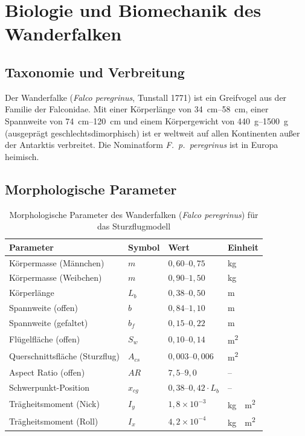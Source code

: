 ﻿\documentclass[12pt,a4paper]{article}
\theoremstyle{remark}
\begin{document}
	\section{Biologie und Biomechanik des Wanderfalken}
	\label{sec:biologie}
	
	\subsection{Taxonomie und Verbreitung}
	
	Der Wanderfalke (\textit{Falco peregrinus}, Tunstall 1771) ist ein Greifvogel aus der Familie der Falconidae. Mit einer Körperlänge von \SIrange{34}{58}{\cm}, einer Spannweite von \SIrange{74}{120}{\cm} und einem Körpergewicht von \SIrange{440}{1500}{\g} (ausgeprägt geschlechtsdimorphisch) ist er weltweit auf allen Kontinenten außer der Antarktis verbreitet. Die Nominatform \textit{F.~p.~peregrinus} ist in Europa heimisch.
	
	\subsection{Morphologische Parameter}
	
	\begin{table}[H]
		\centering
		\caption{Morphologische Parameter des Wanderfalken (\textit{Falco peregrinus}) für das Sturzflugmodell}
		\label{tab:morphologie}
		\begin{tabular}{llll}
			\toprule
			\textbf{Parameter} & \textbf{Symbol} & \textbf{Wert} & \textbf{Einheit} \\
			\midrule
			Körpermasse (Männchen) & $m$ & $0{,}60$--$0{,}75$ & \si{\kg} \\
			Körpermasse (Weibchen) & $m$ & $0{,}90$--$1{,}50$ & \si{\kg} \\
			Körperlänge & $L_b$ & $0{,}38$--$0{,}50$ & \si{\m} \\
			Spannweite (offen) & $b$ & $0{,}84$--$1{,}10$ & \si{\m} \\
			Spannweite (gefaltet) & $b_f$ & $0{,}15$--$0{,}22$ & \si{\m} \\
			Flügelfläche (offen) & $S_w$ & $0{,}10$--$0{,}14$ & \si{\m^2} \\
			Querschnittsfläche (Sturzflug) & $A_{cs}$ & $0{,}003$--$0{,}006$ & \si{\m^2} \\
			Aspect Ratio (offen) & $AR$ & $7{,}5$--$9{,}0$ & -- \\
			Schwerpunkt-Position & $x_{cg}$ & $0{,}38$--$0{,}42 \cdot L_b$ & -- \\
			Trägheitsmoment (Nick) & $I_y$ & $1{,}8 \times 10^{-3}$ & \si{\kg \cdot \m^2} \\
			Trägheitsmoment (Roll) & $I_x$ & $4{,}2 \times 10^{-4}$ & \si{\kg \cdot \m^2} \\
			\bottomrule
		\end{tabular}
	\end{table}
	
\end{document}
